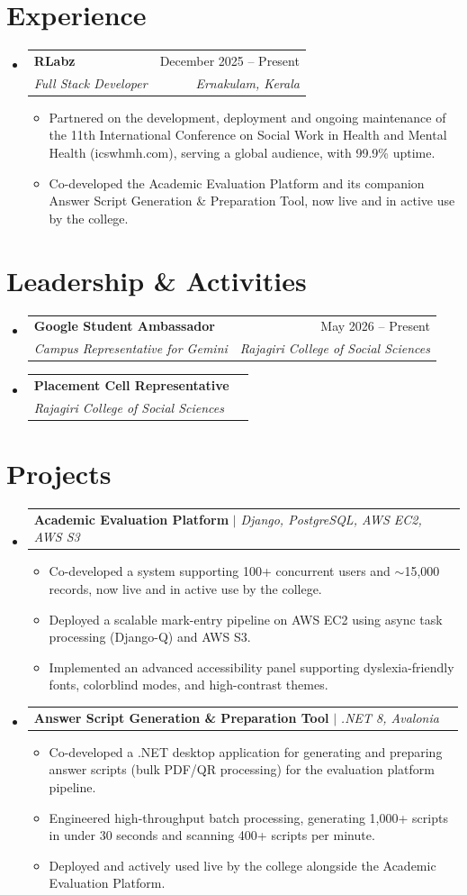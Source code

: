 \documentclass[a4paper,11pt]{article}
\makeatletter
\newcommand{\resumeItem}[1]{
  \item\small{
    {#1 \vspace{-2pt}}
  }
}
\newcommand{\resumeSubheading}[4]{
  \vspace{-2pt}\item
    \begin{tabular*}{0.97\textwidth}[t]{l@{\extracolsep{\fill}}r}
      \textbf{#1} & #2 \\
      \textit{\small#3} & \textit{\small #4} \\
    \end{tabular*}\vspace{-7pt}
}
\newcommand{\resumeProjectHeading}[2]{
    \item
    \begin{tabular*}{0.97\textwidth}{l@{\extracolsep{\fill}}r}
      \small#1 & #2 \\
    \end{tabular*}\vspace{-7pt}
}
\newcommand{\resumeSubHeadingListStart}{\begin{itemize}[leftmargin=0.15in, label={}]}
\newcommand{\resumeSubHeadingListEnd}{\end{itemize}}
\newcommand{\resumeItemListStart}{\begin{itemize}}
\newcommand{\resumeItemListEnd}{\end{itemize}\vspace{-5pt}}
\makeatother
\begin{document}
\section{Experience}
  \resumeSubHeadingListStart

    \resumeSubheading
      {RLabz}{December 2025 -- Present}
      {Full Stack Developer}{Ernakulam, Kerala}
      \resumeItemListStart
        \resumeItem{Partnered on the development, deployment and ongoing maintenance of the 11th International Conference on Social Work in Health and Mental Health (icswhmh.com), serving a global audience, with 99.9\% uptime.}
        \resumeItem{Co-developed the Academic Evaluation Platform and its companion Answer Script Generation \& Preparation Tool, now live and in active use by the college.}
      \resumeItemListEnd

  \resumeSubHeadingListEnd

\section{Leadership \& Activities}
  \resumeSubHeadingListStart
    \resumeSubheading
      {Google Student Ambassador}{May 2026 -- Present}
      {Campus Representative for Gemini}{Rajagiri College of Social Sciences}
    \resumeSubheading
      {Placement Cell Representative}{}
      {Rajagiri College of Social Sciences}{}
  \resumeSubHeadingListEnd

\section{Projects}
    \resumeSubHeadingListStart

      \resumeProjectHeading
          {\textbf{Academic Evaluation Platform} $|$ \emph{Django, PostgreSQL, AWS EC2, AWS S3}}{}
          \resumeItemListStart
            \resumeItem{Co-developed a system supporting 100+ concurrent users and $\sim$15,000 records, now live and in active use by the college.}
            \resumeItem{Deployed a scalable mark-entry pipeline on AWS EC2 using async task processing (Django-Q) and AWS S3.}
            \resumeItem{Implemented an advanced accessibility panel supporting dyslexia-friendly fonts, colorblind modes, and high-contrast themes.}
          \resumeItemListEnd

      \resumeProjectHeading
          {\textbf{Answer Script Generation \& Preparation Tool} $|$ \emph{.NET 8, Avalonia}}{}
          \resumeItemListStart
            \resumeItem{Co-developed a .NET desktop application for generating and preparing answer scripts (bulk PDF/QR processing) for the evaluation platform pipeline.}
            \resumeItem{Engineered high-throughput batch processing, generating 1,000+ scripts in under 30 seconds and scanning 400+ scripts per minute.}
            \resumeItem{Deployed and actively used live by the college alongside the Academic Evaluation Platform.}
          \resumeItemListEnd

    \resumeSubHeadingListEnd
\end{document}
